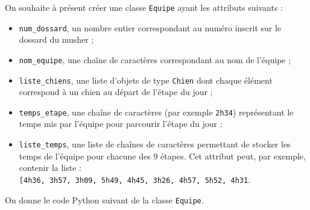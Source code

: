 On souhaite à présent créer une classe \texttt{Equipe} ayant les
attributs suivants :

\begin{itemize}
\tightlist
\item
  \texttt{num\_dossard}, un nombre entier correspondant au numéro
  inscrit sur le dossard du musher ;
\item
  \texttt{nom\_equipe}, une chaîne de caractères correspondant au nom de
  l'équipe ;
\item
  \texttt{liste\_chiens}, une liste d'objets de type \texttt{Chien} dont
  chaque élément correspond à un chien au départ de l'étape du jour ;
\item
  \texttt{temps\_etape}, une chaîne de caractères (par exemple
  \texttt{\textquotesingle{}2h34\textquotesingle{}}) représentant le
  temps mis par l'équipe pour parcourir l'étape du jour ;
\item
  \texttt{liste\_temps}, une liste de chaînes de caractères permettant
  de stocker les temps de l'équipe pour chacune des 9 étapes. Cet
  attribut peut, par exemple, contenir la liste :
  \texttt{{[}\textquotesingle{}4h36\textquotesingle{},\ \textquotesingle{}3h57\textquotesingle{},\ \textquotesingle{}3h09\textquotesingle{},\ \textquotesingle{}5h49\textquotesingle{},\ \textquotesingle{}4h45\textquotesingle{},\ \textquotesingle{}3h26\textquotesingle{},\ \textquotesingle{}4h57\textquotesingle{},\ \textquotesingle{}5h52\textquotesingle{},\ \textquotesingle{}4h31\textquotesingle{}{]}}.
\end{itemize}

On donne le code Python suivant de la classe \texttt{Equipe}.

\begin{Shaded}
\begin{Highlighting}[]
 
    \NormalTok{(}
       \OperatorTok{=}
       \OperatorTok{=}
       \OperatorTok{=}\NormalTok{ []}
       \OperatorTok{=} \StringTok{\textquotesingle{}\textquotesingle{}}
       \OperatorTok{=}\NormalTok{ []}
   
      
  
  
      
\end{Highlighting}
\end{Shaded}


